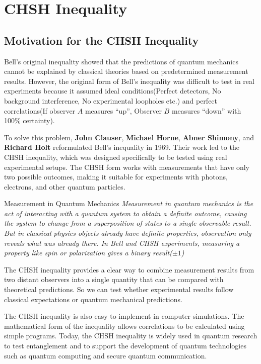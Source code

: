 \documentclass[17pt,a4paper]{extarticle}
\begin{document}
\section*{CHSH Inequality}
\subsection*{Motivation for the CHSH Inequality}
Bell’s original inequality showed that the predictions of quantum mechanics cannot be explained by classical theories based on predetermined measurement results. However, the original form of Bell’s inequality was difficult to test in real experiments because it assumed ideal conditions(Perfect detectors, No background interference, No experimental loopholes etc.) and perfect correlations(If observer $A$ measures “up”, Observer $B$ measures “down” with 100\% certainty).

To solve this problem, \textbf{John Clauser}, \textbf{Michael Horne}, \textbf{Abner Shimony}, and \textbf{Richard Holt} reformulated Bell’s inequality in 1969. Their work led to the CHSH inequality, which was designed specifically to be tested using real experimental setups. The CHSH form works with measurements that have only two possible outcomes, making it suitable for experiments with photons, electrons, and other quantum particles.

\begin{conceptbox}{Measurement in Quantum Mechanics}
\textit{Measurement in quantum mechanics is the act of interacting with a quantum system to obtain a definite outcome, causing the system to change from a superposition of states to a single observable result. But in classical physics objects already have definite properties, observation only reveals what was already there. In Bell and CHSH experiments, measuring a property like spin or polarization gives a binary result($\pm1$)}
\end{conceptbox}

The CHSH inequality provides a clear way to combine measurement results from two distant observers into a single quantity that can be compared with theoretical predictions. So we can test whether experimental results follow classical expectations or quantum mechanical predictions.

The CHSH inequality is also easy to implement in computer simulations. The mathematical form of the inequality allows correlations to be calculated using simple programs. Today, the CHSH inequality is widely used in quantum research to test entanglement and to support the development of quantum technologies such as quantum computing and secure quantum communication.
\end{document}
